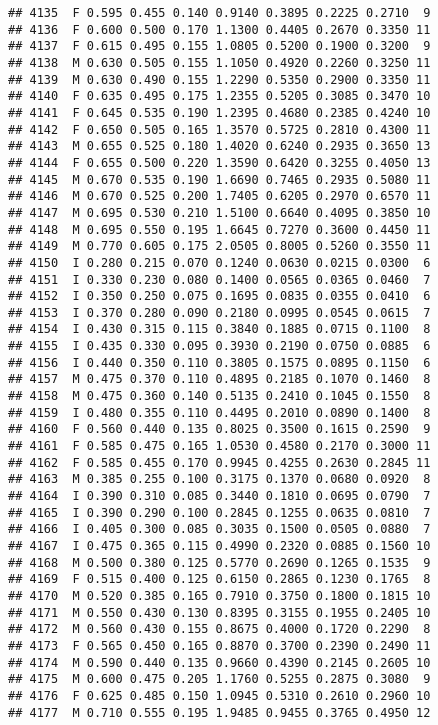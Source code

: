 \documentclass[
]{article}
\begin{document}
\begin{verbatim}
## 4135  F 0.595 0.455 0.140 0.9140 0.3895 0.2225 0.2710  9
## 4136  F 0.600 0.500 0.170 1.1300 0.4405 0.2670 0.3350 11
## 4137  F 0.615 0.495 0.155 1.0805 0.5200 0.1900 0.3200  9
## 4138  M 0.630 0.505 0.155 1.1050 0.4920 0.2260 0.3250 11
## 4139  M 0.630 0.490 0.155 1.2290 0.5350 0.2900 0.3350 11
## 4140  F 0.635 0.495 0.175 1.2355 0.5205 0.3085 0.3470 10
## 4141  F 0.645 0.535 0.190 1.2395 0.4680 0.2385 0.4240 10
## 4142  F 0.650 0.505 0.165 1.3570 0.5725 0.2810 0.4300 11
## 4143  M 0.655 0.525 0.180 1.4020 0.6240 0.2935 0.3650 13
## 4144  F 0.655 0.500 0.220 1.3590 0.6420 0.3255 0.4050 13
## 4145  M 0.670 0.535 0.190 1.6690 0.7465 0.2935 0.5080 11
## 4146  M 0.670 0.525 0.200 1.7405 0.6205 0.2970 0.6570 11
## 4147  M 0.695 0.530 0.210 1.5100 0.6640 0.4095 0.3850 10
## 4148  M 0.695 0.550 0.195 1.6645 0.7270 0.3600 0.4450 11
## 4149  M 0.770 0.605 0.175 2.0505 0.8005 0.5260 0.3550 11
## 4150  I 0.280 0.215 0.070 0.1240 0.0630 0.0215 0.0300  6
## 4151  I 0.330 0.230 0.080 0.1400 0.0565 0.0365 0.0460  7
## 4152  I 0.350 0.250 0.075 0.1695 0.0835 0.0355 0.0410  6
## 4153  I 0.370 0.280 0.090 0.2180 0.0995 0.0545 0.0615  7
## 4154  I 0.430 0.315 0.115 0.3840 0.1885 0.0715 0.1100  8
## 4155  I 0.435 0.330 0.095 0.3930 0.2190 0.0750 0.0885  6
## 4156  I 0.440 0.350 0.110 0.3805 0.1575 0.0895 0.1150  6
## 4157  M 0.475 0.370 0.110 0.4895 0.2185 0.1070 0.1460  8
## 4158  M 0.475 0.360 0.140 0.5135 0.2410 0.1045 0.1550  8
## 4159  I 0.480 0.355 0.110 0.4495 0.2010 0.0890 0.1400  8
## 4160  F 0.560 0.440 0.135 0.8025 0.3500 0.1615 0.2590  9
## 4161  F 0.585 0.475 0.165 1.0530 0.4580 0.2170 0.3000 11
## 4162  F 0.585 0.455 0.170 0.9945 0.4255 0.2630 0.2845 11
## 4163  M 0.385 0.255 0.100 0.3175 0.1370 0.0680 0.0920  8
## 4164  I 0.390 0.310 0.085 0.3440 0.1810 0.0695 0.0790  7
## 4165  I 0.390 0.290 0.100 0.2845 0.1255 0.0635 0.0810  7
## 4166  I 0.405 0.300 0.085 0.3035 0.1500 0.0505 0.0880  7
## 4167  I 0.475 0.365 0.115 0.4990 0.2320 0.0885 0.1560 10
## 4168  M 0.500 0.380 0.125 0.5770 0.2690 0.1265 0.1535  9
## 4169  F 0.515 0.400 0.125 0.6150 0.2865 0.1230 0.1765  8
## 4170  M 0.520 0.385 0.165 0.7910 0.3750 0.1800 0.1815 10
## 4171  M 0.550 0.430 0.130 0.8395 0.3155 0.1955 0.2405 10
## 4172  M 0.560 0.430 0.155 0.8675 0.4000 0.1720 0.2290  8
## 4173  F 0.565 0.450 0.165 0.8870 0.3700 0.2390 0.2490 11
## 4174  M 0.590 0.440 0.135 0.9660 0.4390 0.2145 0.2605 10
## 4175  M 0.600 0.475 0.205 1.1760 0.5255 0.2875 0.3080  9
## 4176  F 0.625 0.485 0.150 1.0945 0.5310 0.2610 0.2960 10
## 4177  M 0.710 0.555 0.195 1.9485 0.9455 0.3765 0.4950 12
\end{verbatim}
\end{document}
